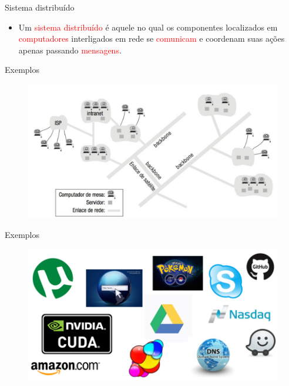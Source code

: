 \documentclass[aspectratio=169,
				xcolor=table]{beamer}
\begin{document}
	\begin{frame}{Sistema distribuído}
		\begin{itemize}
			\item Um \textcolor{red}{sistema distribuído} é aquele no qual os componentes localizados em \textcolor{red}{computadores} interligados em rede se \textcolor{red}{comunicam} e coordenam suas ações apenas passando \textcolor{red}{mensagens}.

		\end{itemize}
	\end{frame}
	
	\begin{frame}{Exemplos}
	
		\begin{figure}
			\centering
			\includegraphics[height=.87\textheight, keepaspectratio]{../figs/cap01/sistemas2.png} 
		\end{figure}
	\end{frame}

	\begin{frame}{Exemplos}
	
		\begin{figure}
			\centering
			\includegraphics[height=.87\textheight, keepaspectratio]{../figs/cap01/sistemas.png} 
		\end{figure}
	\end{frame}
\end{document}
